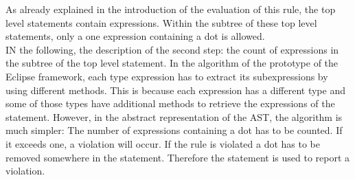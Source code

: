 As already explained in the introduction of the evaluation of this rule, the top level statements contain expressions. Within the subtree of these top level statements, only a one expression containing a dot is allowed.
\\

IN the following, the description of the second step: the count of expressions in the subtree of the top level statement. In the algorithm of the prototype of the Eclipse framework, each type expression has to extract its subexpressions by using different methods. This is because each expression has a different type and some of those types have additional methods to retrieve the expressions of the statement. However, in the abstract representation of the \acf{AST}, the algorithm is much simpler: The number of expressions containing a dot has to be counted. If it exceeds one, a violation will occur. If the rule is violated a dot has to be removed somewhere in the statement. Therefore the statement is used to report a violation.
\\


